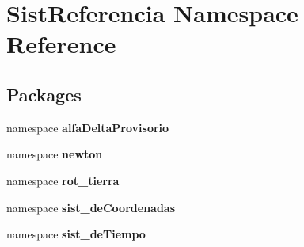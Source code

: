 \section{\-Sist\-Referencia \-Namespace \-Reference}
\label{namespace_sist_referencia}
\subsection*{\-Packages}
\begin{DoxyCompactItemize}
\item 
namespace {\bf alfa\-Delta\-Provisorio}
\item 
namespace {\bf newton}
\item 
namespace {\bf rot\-\_\-tierra}
\item 
namespace {\bf sist\-\_\-de\-Coordenadas}
\item 
namespace {\bf sist\-\_\-de\-Tiempo}
\end{DoxyCompactItemize}
